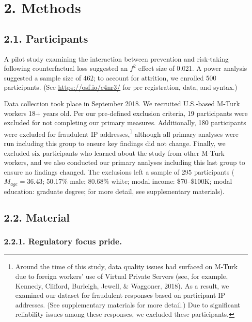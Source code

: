 \documentclass[man,floatsintext]{apa6}
\let\rmarkdownfootnote\footnote%
\def\footnote{\protect\rmarkdownfootnote}
\begin{document}
\hypertarget{methods}{%
\section{2. Methods}\label{methods}}

\hypertarget{participants}{%
\subsection{2.1. Participants}\label{participants}}

A pilot study examining the interaction between prevention and risk-taking following counterfactual loss suggested an \(f^2\) effect size of 0.021. A power analysis suggested a sample size of 462; to account for attrition, we enrolled 500 participants. (See \url{https://osf.io/e4nr3/} for pre-registration, data, and syntax.)

Data collection took place in September 2018. We recruited U.S.-based M-Turk workers 18+ years old. Per our pre-defined exclusion criteria, 19 participants were excluded for not completing our primary measures. Additionally, 180 participants were excluded for fraudulent IP addresses,\footnote{Around the time of this study, data quality issues had surfaced on M-Turk due to foreign workers' use of Virtual Private Servers (see, for example, Kennedy, Clifford, Burleigh, Jewell, \& Waggoner, 2018). As a result, we examined our dataset for fraudulent responses based on participant IP addresses. (See supplementary materials for more detail.) Due to significant reliability issues among these responses, we excluded these participants.} although all primary analyses were run including this group to ensure key findings did not change. Finally, we excluded six participants who learned about the study from other M-Turk workers, and we also conducted our primary analyses including this last group to ensure no findings changed. The exclusions left a sample of 295 participants (\(M_{age}=36.43\); 50.17\% male; 80.68\% white; modal income: \$70--\$100K; modal education: graduate degree; for more detail, see supplementary materials).

\hypertarget{material}{%
\subsection{2.2. Material}\label{material}}

\hypertarget{regulatory-focus-pride.}{%
\subsubsection{2.2.1. Regulatory focus pride.}\label{regulatory-focus-pride.}}
\end{document}
